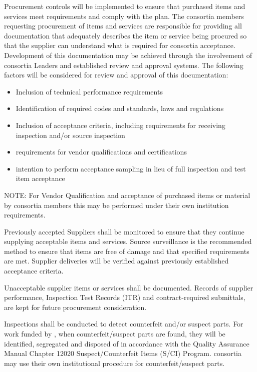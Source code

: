   Procurement controls will be implemented to ensure that
purchased items and services meet  requirements and comply
with the   plan.  The consortia members
requesting procurement of items and services are responsible for
providing all documentation that adequately describes the item or
service being procured so that the supplier can understand what is
required for consortia acceptance. Development of this documentation
may be achieved through the involvement of consortia Leaders and
established review and approval systems. The following factors will be
considered for review and approval of this documentation:
\begin{itemize}
 \item Inclusion of technical performance requirements
 \item Identification of required codes and standards, laws and
   regulations
 \item Inclusion of acceptance criteria, including requirements for
   receiving inspection and/or source inspection
 \item {} requirements for vendor qualifications and
   certifications
 \item {} intention to perform acceptance sampling in lieu
   of full inspection and test item acceptance
\end{itemize}
NOTE: For Vendor Qualification and acceptance of purchased items or
material by consortia members this may be performed under their own
institution requirements.

Previously accepted Suppliers shall be monitored to ensure that they
continue supplying acceptable items and services. Source surveillance
is the recommended method to ensure that items are free of damage and
that specified requirements are met. Supplier deliveries will be
verified against previously established acceptance criteria.

Unacceptable supplier items or services shall be documented. Records
of supplier performance, Inspection Test Records (ITR) and
contract-required submittals, are kept for future procurement
consideration.

Inspections shall be conducted to detect counterfeit and/or suspect
parts. For work funded by , when counterfeit/suspect parts
are found, they will be identified, segregated and disposed of in
accordance with the \fnal Quality Assurance Manual Chapter 12020
Suspect/Counterfeit Items (S/CI) Program.  consortia may
use their own institutional procedure for counterfeit/suspect parts.

